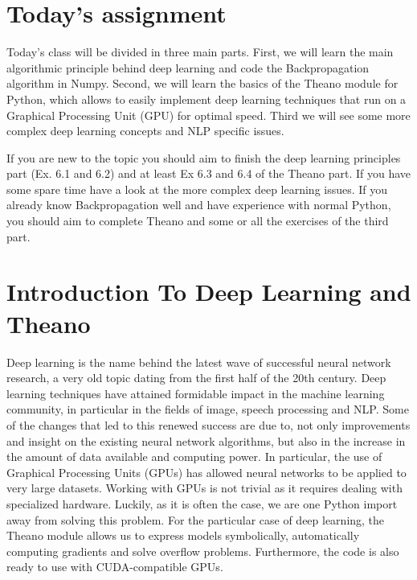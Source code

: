 \section{Today's assignment}
Today's class will be divided in three main parts. First, we will learn the main 
algorithmic principle behind deep learning and code the Backpropagation algorithm 
in Numpy.  Second, we will learn the basics of the Theano module for Python, 
which allows to easily implement deep learning techniques that run on a 
Graphical Processing Unit (GPU) for optimal speed. Third we will see some more 
complex deep learning concepts and NLP specific issues.

If you are new to the topic you should aim to finish the deep learning 
principles part (Ex. 6.1 and 6.2) and at least Ex 6.3 and 6.4 of the Theano 
part. If you have some spare time have a look at the more complex deep learning 
issues. If you already know Backpropagation well and have experience with normal 
Python, you should aim to complete Theano and some or all the exercises of the 
third part. 

\section{Introduction To Deep Learning and Theano}

Deep learning is the name behind the latest wave of successful neural network 
research, a very old topic dating from the first half of the 20th century. Deep 
learning techniques have attained formidable impact in the machine learning 
community, in particular in the fields of image, speech processing and NLP. 
Some of the changes that led to this renewed success are due to, not only
improvements and insight on the existing neural network algorithms, but also in
the increase in the amount of data available and computing power. In
particular, the use of Graphical Processing Units (GPUs) has allowed neural
networks to be applied to very large datasets. Working with GPUs is not trivial
as it requires dealing with specialized hardware. Luckily, as it is often the
case, we are one Python import away from solving this problem. For the
particular case of deep learning, the
Theano\footnotemark{}
module allows us to express models symbolically, automatically computing
gradients and solve overflow problems. Furthermore, the code is also ready to
use with CUDA-compatible GPUs.

